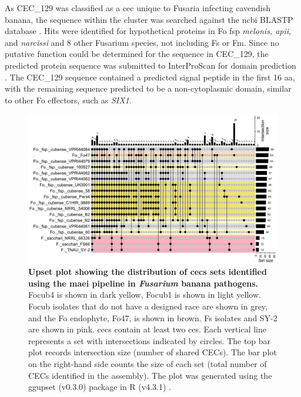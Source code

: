 As CEC\_129 was classified as a \ac{cec} unique to Fusaria infecting cavendish banana, the sequence within the cluster was searched against the \ac{ncbi} BLASTP database \parencite{Nih2014}. Hits were identified for hypothetical proteins in \ac{Fo} \ac{fsp} \textit{melonis, apii}, and \textit{narcissi} and 8 other Fusarium species, not including \ac{Fs} or \ac{Fm}. Since no putative function could be determined for the sequence in CEC\_129, the predicted protein sequence was submitted to InterProScan for domain prediction \parencite{jones2014interproscan}. The CEC\_129 sequence contained a predicted signal peptide in the first 16 aa, with the remaining sequence predicted to be a non-cytoplasmic domain, similar to other \ac{Fo} effectors, such as \textit{SIX1}.




    
\begin{figure}
    \centering
    \includegraphics[width=\textwidth]{Figures/UpSetCECofBanana.png}
    \captionsetup{width=20cm}
    \caption[Upset plot of \ac{cec} distribution between \textit{Fusarium} banana pathogens.]{\textbf{Upset plot showing the distribution of \acp{cec} sets identified using the \ac{maei} pipeline in \textit{Fusarium} banana pathogens.}
    \ac{Focub4} is shown in dark yellow,  \ac{Focub1} is shown in light yellow. \ac{Focub} isolates that do not have a designed race are shown in grey, and the \ac{Fo} endophyte, Fo47, is shown in brown. \acl{Fs} isolates and SY-2 are shown in pink. \Acp{cec} contain at least two \aclp{ce}. Each vertical line represents a set with intersections indicated by circles. The top bar plot records intersection size (number of shared CECs). The bar plot on the right-hand side counts the size of each set (total number of CECs identified in the assembly). The plot was generated using the ggupset (v0.3.0) \parencite{ggupset} package in R (v4.3.1) \parencite{R}.}
    \label{fig:UpSetCECofBanana}
\end{figure}



